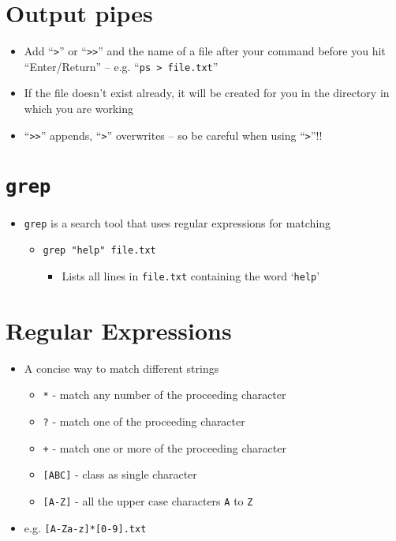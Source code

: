 \documentclass{article}
\begin{document}
\section{Output pipes}
\begin{itemize}
\item Add ``\verb!>!'' or ``\verb!>>!'' and the name of a file after your command before you hit ``Enter/Return'' -- e.g. ``\verb!ps > file.txt!''

\item If the file doesn't exist already, it will be created for you in the directory in which you are working

\item ``\verb!>>!'' appends, ``\verb!>!'' overwrites -- so be careful when using ``\verb!>!''!!
\end{itemize}







\section{\texttt{grep}}
\begin{itemize}
\item \verb!grep! is a search tool that uses regular expressions for matching
\begin{itemize}
\item \texttt{grep "help" file.txt}
\begin{itemize}
\item Lists all lines in \verb!file.txt! containing the word `\verb!help!'
\end{itemize}
\end{itemize}
\end{itemize}



\section{Regular Expressions}
\begin{itemize}
\item A concise way to match different strings
\begin{itemize}
\item \verb!*! - match any number of the proceeding character
\item \verb!?! - match one of the proceeding character
\item \verb!+! - match one or more of the proceeding character
\item \verb![ABC]! - class as single character
\item \verb![A-Z]! - all the upper case characters \verb!A! to \verb!Z!
\end{itemize}
\item e.g. \verb![A-Za-z]*[0-9].txt!
\end{itemize}
\end{document}
